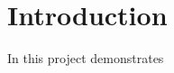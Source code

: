 \documentclass[Main]{subfiles}
\begin{document}
\section{Introduction} %
\label{sec:introduction}
In this project demonstrates 



\end{document}
